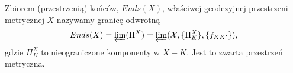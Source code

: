\begin{definition}{}{}
  Zbiorem (przestrzenią) końców, $Ends(X)$, właściwej geodezyjnej przestrzeni metrycznej $X$ nazywamy granicę odwrotną
  $$Ends(X)=\varprojlim(\Pi^X)=\varprojlim(\mathcal{X}, \{\Pi_K^X\}, \{f_{KK'}\}),$$
  gdzie $\Pi_K^X$ to nieograniczone komponenty w $X-K$.  Jest to zwarta przestrzeń metryczna.
\end{definition}



